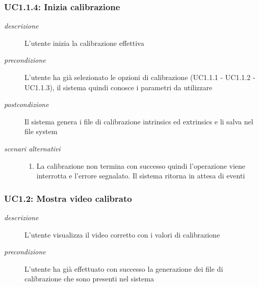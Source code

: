 \subsubsection{UC1.1.4: Inizia calibrazione} \label{sec:UC1.1.4}
\begin{description}
\item[\em{descrizione }]L'utente inizia la calibrazione effettiva
\item[\em{precondizione }] L'utente ha già selezionato le opzioni di calibrazione (UC1.1.1 - UC1.1.2 - UC1.1.3), il sistema quindi conosce i parametri da utilizzare
\item[\em{postcondizione }] Il sistema genera i file di calibrazione intrinsics ed extrinsics e li salva nel file system
\item[\em{scenari alternativi }] \mbox{} 
\begin{enumerate} 
\item La calibrazione non termina con successo quindi l'operazione viene interrotta e l'errore segnalato. Il sistema ritorna in attesa di eventi
\end{enumerate}
\end{description}

\subsubsection{UC1.2: Mostra video calibrato} \label{sec:UC1.2}
\begin{description}
\item[\em{descrizione }]L'utente visualizza il video corretto con i valori di calibrazione
\item[\em{precondizione }] L'utente ha già effettuato con successo la generazione dei file di calibrazione che sono presenti nel sistema
\end{description}


